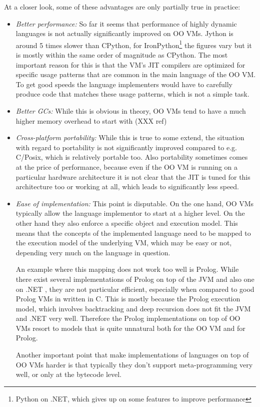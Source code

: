 \documentclass{llncs}
\begin{document}
\noindent
At a closer look, some of these advantages are only partially true in practice:

\begin{itemize}
\item
\emph{Better performance:} So far it seems that performance of highly dynamic
languages is not actually significantly improved on OO VMs. 
Jython is around 5
times slower than CPython, for IronPython\footnote{Python on .NET, which
gives up on some features to improve performance}
the figures vary but it is mostly
within the same order of magnitude as CPython. The most important reason for
this is that the VM's JIT compilers are optimized for specific usage patterns
that are common in the main language of the OO VM. To get good speeds the
language implementers would have to carefully produce code that matches these
usage patterns, which is not a simple task.

\item
\emph{Better GCs:} While this is obvious in theory, OO VMs tend to have a much
higher memory overhead to start with (XXX ref)

\item
\emph{Cross-platform portability:} While this is true to some extend, the
situation with regard to portability is not significantly improved compared to
e.g.  C/Posix, which is relatively portable too. Also portability sometimes
comes at the price of performance, because even if the OO VM is running on a
particular hardware architecture it is not clear that the JIT is tuned for this
architecture too or working at all, which leads to significantly less
speed.

\item
\emph{Ease of implementation:} This point is disputable. On the one hand, OO
VMs typically allow the language implementor to start at a higher level. On the
other hand they also enforce a specific object and execution model. This means
that the concepts of the implemented language need to be mapped to the
execution model of the underlying VM, which may be easy or not, depending very
much on the language in question.

An example where this mapping does not work too well is Prolog. While there
exist several implementations of Prolog on top of the JVM \cite{prologcafe}
\cite{InterProlog} and also one on .NET \cite{psharp},
they are not particular efficient, especially when compared to good Prolog VMs
in written in C. This is mostly because the Prolog execution model, which
involves backtracking and deep recursion does not fit the JVM and .NET very
well. Therefore the Prolog implementations on top of OO VMs resort to models
that is quite unnatural both for the OO VM and for Prolog.

Another important point that make implementations of languages on top of OO VMs
harder is that typically they don't support meta-programming very well, or only
at the bytecode level.
\end{itemize}
\end{document}

